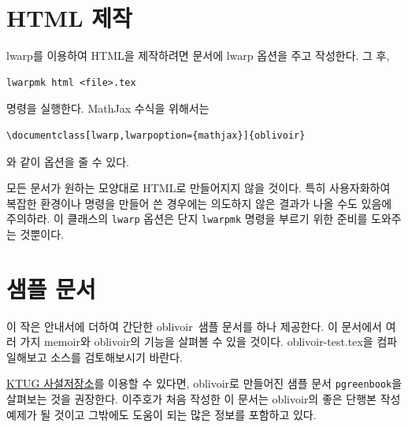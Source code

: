 \documentclass[
	12pt,
	a4paper,
	kosection,
	footnote,
	nobookmarks,
	microtype,
	figtabcapt,
]{oblivoir}
\newcommand\obclass{ob\-liv\-oir\oblivoirallowbreak}
\begin{document}
\section{HTML 제작}

\textsf{lwarp}를 이용하여 HTML을 제작하려면 문서에 \textsf{lwarp} 
옵션을 주고 작성한다. 그 후,
\begin{verbatim}
lwarpmk html <file>.tex
\end{verbatim}
명령을 실행한다. MathJax 수식을 위해서는 
\begin{verbatim}
\documentclass[lwarp,lwarpoption={mathjax}]{oblivoir}
\end{verbatim}
와 같이 옵션을 줄 수 있다.

모든 문서가 원하는 모양대로 HTML로 만들어지지 않을 것이다. 특히
사용자화하여 복잡한 환경이나 명령을 만들어 쓴 경우에는 의도하지 않은
결과가 나올 수도 있음에 주의하라. 이 클래스의 \verb|lwarp| 옵션은
단지 \verb|lwarpmk| 명령을 부르기 위한 준비를 도와주는 것뿐이다.

\section{샘플 문서}

이 작은 안내서에 더하여 간단한 \obclass\ 샘플 문서를 하나 제공한다.
이 문서에서 여러 가지 memoir와 \obclass 의 기능을 살펴볼 수 있을 것이다.
oblivoir-test.tex을 컴파일해보고 소스를 검토해보시기 바란다.

\href{http://wiki.ktug.org/wiki/wiki.php/KtugPrivateRepository}{KTUG 사설저장소}를 이용할 수 있다면, \obclass 로 만들어진 샘플 문서 \texttt{pgreenbook}을
살펴보는 것을 권장한다. 이주호가 처음 작성한 이 문서는 \obclass 의 좋은 단행본 작성 예제가
될 것이고 그밖에도 도움이 되는 많은 정보를 포함하고 있다.
\end{document}
